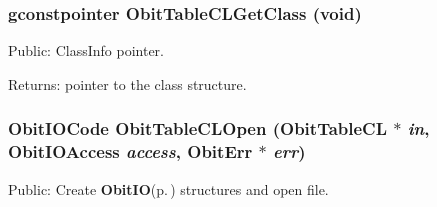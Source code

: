 \subsubsection{\setlength{\rightskip}{0pt plus 5cm}gconstpointer Obit\-Table\-CLGet\-Class (void)}\label{ObitTableCL_8h_a13}


Public: Class\-Info pointer. 

\begin{Desc}
\item[Returns:]pointer to the class structure. \end{Desc}
\subsubsection{\setlength{\rightskip}{0pt plus 5cm}Obit\-IOCode Obit\-Table\-CLOpen ({\bf Obit\-Table\-CL} $\ast$ {\em in}, Obit\-IOAccess {\em access}, {\bf Obit\-Err} $\ast$ {\em err})}\label{ObitTableCL_8h_a17}


Public: Create {\bf Obit\-IO}{\rm (p.\,\pageref{structObitIO})} structures and open file. 


